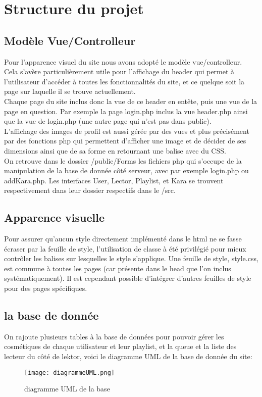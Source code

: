 \section{Structure du projet}
\subsection{Modèle Vue/Controlleur}
Pour l'apparence visuel du site nous avons adopté le modèle vue/controlleur. \\
Cela s'avère particulièrement utile pour l'affichage du header qui permet à l'utilisateur d'accéder à toutes les fonctionnalités du site, et ce quelque soit la page sur laquelle il se trouve actuellement.\\
Chaque page du site inclus donc la vue de ce header en entête, puis une vue de la page en question.
Par exemple la page login.php inclus la vue header.php ainsi que la vue de login.php (une autre page qui n'est pas dans public).\\
L'affichage des images de profil est aussi gérée par des vues et plus précisément par des fonctions php qui permettent d'afficher une image et de décider de ses dimensions ainsi que de sa forme en retournant une balise avec du CSS.\\
On retrouve dans le dossier /public/Forms les fichiers php qui s'occupe de la manipulation de la base de donnée côté serveur, avec par exemple login.php ou addKara.php.\newline
Les interfaces User, Lector, Playlist, et Kara se trouvent respectivement dans leur dossier respectifs dans le /src.


\subsection{Apparence visuelle}
Pour assurer qu'aucun style directement implémenté dans le html ne se fasse écraser par la feuille de style, l'utilisation de classe à été privilégié pour mieux contrôler les balises sur lesquelles le style s'applique. Une feuille de style, style.css, est commune à toutes les pages (car présente dans le head que l'on inclus systématiquement). Il est cependant possible d'intégrer d'autres feuilles de style pour des pages spécifiques.

\subsection{la base de donnée}
On rajoute plusieurs tables à la base de données pour pouvoir gérer les cosmétiques de chaque utilisateur et leur playlist, et la queue et la liste des lecteur du côté de lektor, voici le diagramme UML de la base de donnée du site:
\newline
\begin{figure}[h!]
\centering
\texttt{[image: diagrammeUML.png]}
\caption{diagramme UML de la base}
\label{fig:diagramme UML}
\end{figure}

